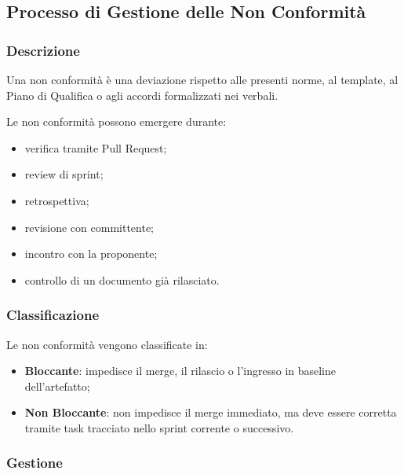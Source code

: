 \subsection{Processo di Gestione delle Non Conformità}
\label{sec:non-conformita}

\subsubsection{Descrizione}

Una non conformità è una deviazione rispetto alle presenti norme, al template, al
Piano di Qualifica o agli accordi formalizzati nei verbali.

Le non conformità possono emergere durante:

\begin{itemize}
    \item verifica tramite Pull Request;
    \item review di sprint;
    \item retrospettiva;
    \item revisione con committente;
    \item incontro con la proponente;
    \item controllo di un documento già rilasciato.
\end{itemize}


\subsubsection{Classificazione}

Le non conformità vengono classificate in:

\begin{itemize}
    \item \textbf{Bloccante}: impedisce il merge, il rilascio o l'ingresso in baseline
    dell'artefatto;

    \item \textbf{Non Bloccante}: non impedisce il merge immediato, ma deve essere
    corretta tramite task tracciato nello sprint corrente o successivo.
\end{itemize}


\subsubsection{Gestione}

